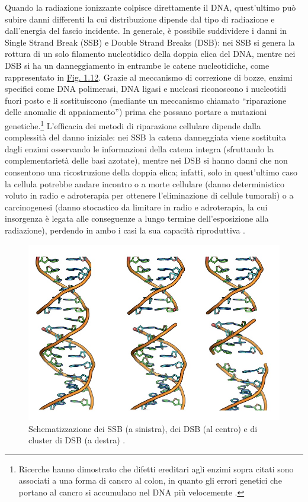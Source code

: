 \documentclass[12pt,a4paper,twoside]{report}
\begin{document}
	Quando la radiazione ionizzante colpisce direttamente il DNA, quest'ultimo può subire danni differenti la cui distribuzione dipende dal tipo di radiazione e dall'energia del fascio incidente. In generale, è possibile suddividere i danni in Single Strand Break (SSB) e Double Strand Breaks (DSB): nei SSB si genera la rottura di un solo filamento nucleotidico della doppia elica del DNA, mentre nei DSB si ha un danneggiamento in entrambe le catene nucleotidiche, come rappresentato in \hyperref[fig:danni_dna]{Fig. 1.12}. Grazie al meccanismo di correzione di bozze, enzimi specifici come DNA polimerasi, DNA ligasi e nucleasi riconoscono i nucleotidi fuori posto e li sostituiscono (mediante un meccanismo chiamato ``riparazione delle anomalie di appaiamento'') prima che possano portare a mutazioni genetiche.\footnote{Ricerche hanno dimostrato che difetti ereditari agli enzimi sopra citati sono associati a una forma di cancro al colon, in quanto gli errori genetici che portano al cancro si accumulano nel DNA più velocemente \cite{campbell2anno}.} L'efficacia dei metodi di riparazione cellulare dipende dalla complessità del danno iniziale: nei SSB la catena danneggiata viene sostituita dagli enzimi osservando le informazioni della catena integra (sfruttando la complementarietà delle basi azotate), mentre nei DSB si hanno danni che non consentono una ricostruzione della doppia elica; infatti, solo in quest'ultimo caso la cellula potrebbe andare incontro o a morte cellulare (danno deterministico voluto in radio e adroterapia per ottenere l'eliminazione di cellule tumorali) o a carcinogenesi (danno stocastico da limitare in radio e adroterapia, la cui insorgenza è legata alle conseguenze a lungo termine dell'esposizione alla radiazione), perdendo in ambo i casi la sua capacità riproduttiva \cite{unipv_conference}.
	\begin{figure}[H]
		\centering
		\includegraphics[width=0.9\linewidth]{danni_dna.jpg}
		\caption{Schematizzazione dei SSB (a sinistra), dei DSB (al centro) e di cluster di DSB (a destra) \cite{unipv_conference}.}
		\label{fig:danni_dna}
	\end{figure}
	
\end{document}
